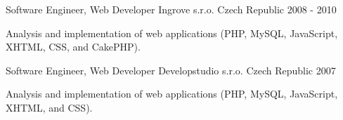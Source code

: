 \begin{cventries}
\cventry
{Software Engineer, Web Developer} %
{Ingrove s.r.o.} %
{Czech Republic} %
{2008 - 2010} %
{
	\begin{cvitems} %
		\item {Analysis and implementation of web applications (PHP, MySQL, JavaScript, XHTML, CSS, and CakePHP).}
	\end{cvitems}
}

\cventry
{Software Engineer, Web Developer} %
{Developstudio s.r.o.} %
{Czech Republic} %
{2007} %
{
	\begin{cvitems} %
		\item {Analysis and implementation of web applications (PHP, MySQL, JavaScript, XHTML, and CSS).}
	\end{cvitems}
}

\end{cventries}
